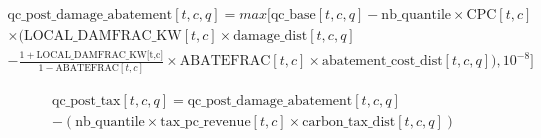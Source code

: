 \documentclass[
]{article}
\begin{document}
\begin{multline}
  \text{qc\_post\_damage\_abatement}[t,c,q] = max \biggl[\text{qc\_base}[t,c,q] - \text{nb\_quantile} \times \text{CPC}[t,c] \\
 \times \biggl(\text{LOCAL\_DAMFRAC\_KW}[t,c] \times \text{damage\_dist}[t,c,q] \\
 - \frac{1 + \text{LOCAL\_DAMFRAC\_KW[t,c]}}{1 - \text{ABATEFRAC}[t,c]} \times \text{ABATEFRAC}[t,c] \times \text{abatement\_cost\_dist}[t,c,q]\biggr), 10^{-8} \biggr] 
\end{multline}


\begin{multline}
  \text{qc\_post\_tax}[t,c,q] = \text{qc\_post\_damage\_abatement}[t,c,q] \\
 - (\text{nb\_quantile} \times \text{tax\_pc\_revenue}[t,c] \times \text{carbon\_tax\_dist}[t,c,q]) 
\end{multline}
\end{document}
